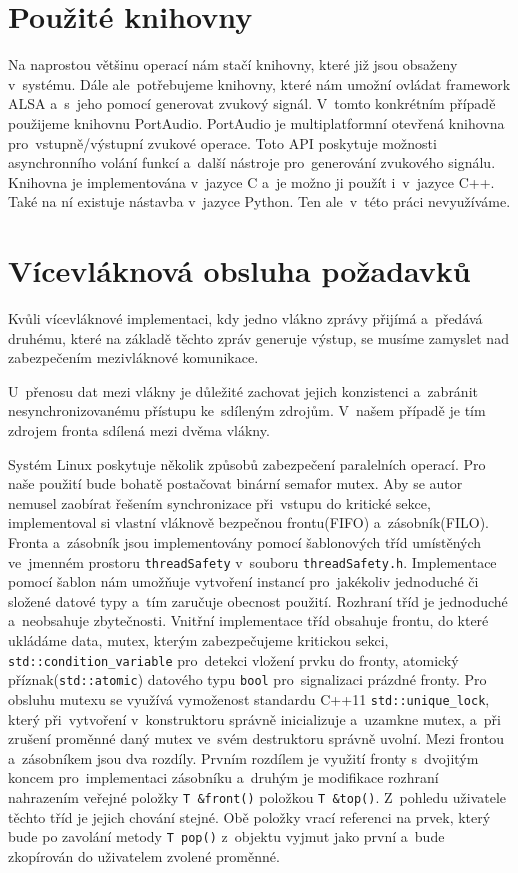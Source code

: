	\section{Použité knihovny}
	Na naprostou většinu operací nám stačí knihovny, které již jsou obsaženy v~systému. Dále ale~potřebujeme knihovny, které nám umožní ovládat framework ALSA a~s~jeho pomocí generovat zvukový signál. V~tomto konkrétním případě použijeme knihovnu PortAudio\cite{portAudio}. PortAudio je multiplatformní otevřená knihovna pro~vstupně/výstupní zvukové operace. Toto API poskytuje možnosti asynchronního volání funkcí a~další nástroje pro~generování zvukového signálu. Knihovna je implementována v~jazyce C a~je možno ji použít i~v~jazyce C++. Také na ní existuje nástavba v~jazyce Python. Ten ale~v~této práci nevyužíváme.
	
	
	\section{Vícevláknová obsluha požadavků}
	Kvůli vícevláknové implementaci, kdy jedno vlákno zprávy přijímá a~předává druhému, které na základě těchto zpráv generuje výstup, se musíme zamyslet nad zabezpečením mezivláknové komunikace.\par
	U~přenosu dat mezi vlákny je důležité zachovat jejich konzistenci a~zabránit nesynchronizovanému přístupu ke~sdíleným zdrojům. V~našem případě je tím zdrojem fronta sdílená mezi dvěma vlákny.\par
	Systém Linux poskytuje několik způsobů zabezpečení paralelních operací. Pro naše použití bude bohatě postačovat binární semafor mutex. Aby se autor nemusel zaobírat řešením synchronizace při~vstupu do kritické sekce, implementoval si vlastní vláknově bezpečnou frontu(FIFO) a~zásobník(FILO). Fronta a~zásobník jsou implementovány pomocí šablonových tříd umístěných ve~jmenném prostoru \texttt{threadSafety} v~souboru \texttt{threadSafety.h}. Implementace pomocí šablon nám umožňuje vytvoření instancí pro~jakékoliv jednoduché či složené datové typy a~tím zaručuje obecnost použití. Rozhraní tříd je jednoduché a~neobsahuje zbytečnosti. Vnitřní implementace tříd obsahuje frontu, do které ukládáme data, mutex, kterým zabezpečujeme kritickou sekci, \texttt{std::condition\_variable} pro~detekci vložení prvku do fronty, atomický příznak(\texttt{std::atomic}) datového typu \texttt{bool} pro~signalizaci prázdné fronty. Pro obsluhu mutexu se využívá vymoženost standardu C++11 \texttt{std::unique\_lock}, který při~vytvoření v~konstruktoru správně inicializuje a~uzamkne mutex, a~při zrušení proměnné daný mutex ve~svém destruktoru správně uvolní. Mezi frontou a~zásobníkem jsou dva rozdíly. Prvním rozdílem je využití fronty s~dvojitým koncem pro~implementaci zásobníku a~druhým je modifikace rozhraní nahrazením veřejné položky \texttt{T \&front()} položkou \texttt{T \&top()}. Z~pohledu uživatele těchto tříd je jejich chování stejné. Obě položky vrací referenci na prvek, který bude po zavolání metody \texttt{T pop()} z~objektu vyjmut jako první a~bude zkopírován do uživatelem zvolené proměnné.\par
